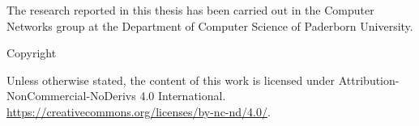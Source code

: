 \thispagestyle{empty}

\thetitle{}

\theauthor{}

The research reported in this thesis has been carried out in the Computer Networks group at the Department of Computer Science of Paderborn University.

\vspace*{\fill}

Copyright \textcopyright \the\year{} \theauthor{}

\ccbyncndeu

Unless otherwise stated, the content of this work is licensed under Attribution-NonCommercial-NoDerivs 4.0 International. \href{https://creativecommons.org/licenses/by-nc-nd/4.0/}{https://creativecommons.org/licenses/by-nc-nd/4.0/}.
